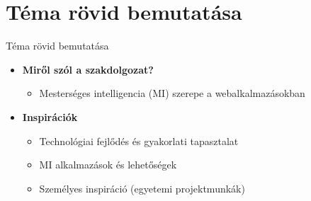 \documentclass[aspectratio=169, 11pt]{beamer}
\begin{document}
\section{Téma rövid bemutatása}
\begin{frame}{Téma rövid bemutatása}
    \begin{itemize}
        \item \textbf{Miről szól a szakdolgozat?}
        \begin{itemize}
            \vspace{0.5em}
            \item Mesterséges intelligencia (MI) szerepe a webalkalmazásokban
        \end{itemize}
        
        \vspace{0.75em}
        
        \item \textbf{Inspirációk}
        \begin{itemize}
            \vspace{0.5em}
            \item Technológiai fejlődés és gyakorlati tapasztalat
            \vspace{0.5em}
            \item MI alkalmazások és lehetőségek
            \vspace{0.5em}
            \item Személyes inspiráció (egyetemi projektmunkák)
        \end{itemize}
        
        \vspace{0.75em}
        

\end{itemize}
\end{frame}
\end{document}
